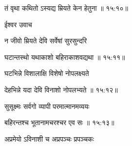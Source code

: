
{\devanagarifont तं वृथा कथितो ऽस्यद्य म्रियते केन हेतुना {॥ १५:१०॥} \veg\dontdisplaylinenum }%

{\devanagarifont ईश्वर उवाच {\dandab}\dontdisplaylinenum  }%

{\devanagarifont न जीवो म्रियते देवि सर्वेषां सुरसुन्दरि \thinspace{\danda} \dontdisplaylinenum }%
 

{\devanagarifont घटान्तस्थो यथाकाशो बहिराकाशवद्यथा {॥ १५:११॥} \veg\dontdisplaylinenum }%
 
{\devanagarifont घटभिन्ने विशालाक्षि विशेषो नोपलक्ष्यते \thinspace{\dandab} \dontdisplaylinenum }%


{\devanagarifont देहभिन्ने यदा देवि विनाशो नोपलभ्यते {॥ १५:१२॥} \veg\dontdisplaylinenum }%

{\devanagarifont सुसूक्ष्मः सर्वगो व्यापी परमात्मानमव्ययः \thinspace{\dandab} \dontdisplaylinenum }%


{\devanagarifont बहिरन्तश्च भूतानामचरश्चर एव सः {॥ १५:१३॥} \veg\dontdisplaylinenum }%

{\devanagarifont अप्रमेयो ऽविनाशी च अप्रपञ्चः प्रपञ्चकः \thinspace{\dandab} \dontdisplaylinenum }%

